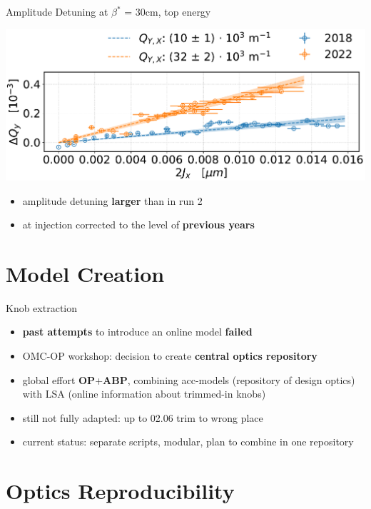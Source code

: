 \documentclass[4pt,usenames,dvipsnames,aspectratio=169,table]{beamer}
\newcommand{\highl}[1]{\textbf{#1}}
\begin{document}
\begin{frame}{Amplitude Detuning at $\beta^*$ = 30cm, top energy}
    \begin{center}
        \includegraphics[width=0.5\linewidth]{images/nonlinear/comparison_2018_2022_dQYd2JX_corrected.pdf}
    \end{center}
    
    \begin{itemize}
        \item amplitude detuning \highl{larger} than in run 2
        \item at injection corrected to the level of \highl{previous years}
    \end{itemize}
\end{frame}


\section{Model Creation}

\begin{frame}{Knob extraction}

\begin{itemize}
    \item \highl{past attempts} to introduce an online model \highl{failed}
    \item OMC-OP workshop: decision to create \highl{central optics repository}
    \item  global effort \highl{OP}+\highl{ABP}, combining acc-models (repository of design optics) with
LSA (online information about trimmed-in knobs)
    \item still not fully adapted: up to 02.06 trim to wrong place
    \item current status: separate scripts, modular, plan to combine in one repository
\end{itemize}

\end{frame}

\section{Optics Reproducibility}
\end{document}
